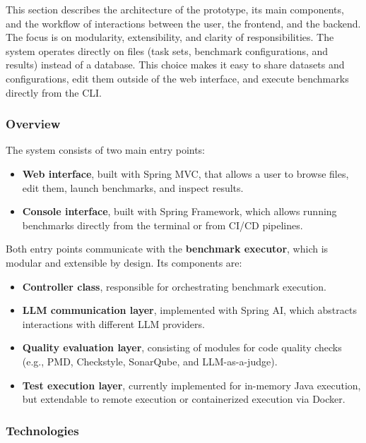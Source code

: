 This section describes the architecture of the prototype, its main components, and the workflow of interactions between the user, the frontend, and the backend.
The focus is on modularity, extensibility, and clarity of responsibilities.
The system operates directly on files (task sets, benchmark configurations, and results) instead of a database.
This choice makes it easy to share datasets and configurations, edit them outside of the web interface, and execute benchmarks directly from the CLI.

\subsubsection{Overview}

The system consists of two main entry points:
\begin{itemize}
    \item \textbf{Web interface}, built with Spring MVC, that allows a user to browse files, edit them, launch benchmarks, and inspect results.
    \item \textbf{Console interface}, built with Spring Framework, which allows running benchmarks directly from the terminal or from CI/CD pipelines.
\end{itemize}

Both entry points communicate with the \textbf{benchmark executor}, which is modular and extensible by design.
Its components are:
\begin{itemize}
    \item \textbf{Controller class}, responsible for orchestrating benchmark execution.
    \item \textbf{LLM communication layer}, implemented with Spring AI, which abstracts interactions with different LLM providers.
    \item \textbf{Quality evaluation layer}, consisting of modules for code quality checks (e.g., PMD, Checkstyle, SonarQube, and LLM-as-a-judge).
    \item \textbf{Test execution layer}, currently implemented for in-memory Java execution, but extendable to remote execution or containerized execution via Docker.
\end{itemize}

\subsubsection{Technologies}

